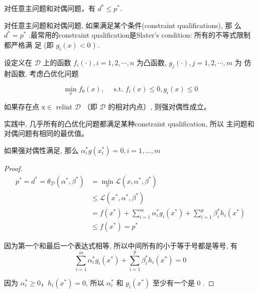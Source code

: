 \begin{theorem}[弱对偶性]
    对任意主问题和对偶问题，有 $ d^{*} \leqslant p^{*} $.
\end{theorem}

\begin{theorem}[强对偶性]
    对任意主问题和对偶问题, 如果满足某个条件(constraint qualifications), 那 么 $ d^{*}=p^{*} $ .最常用的constraint qualification是Slater's condition: 所有的不等式限制都严格满 足 (即 $ g_{i}(x)<0 $ ) .
\end{theorem}

\begin{theorem}[Slater 条件]
    设定义在 $ \mathcal{D} $ 上的函数 $ f_{i}(\cdot), i=1,2, \cdots, n $ 为凸函数, $ g_{j}(\cdot), j=1,2, \cdots, m $ 为 仿射函数, 考虑凸优化问题

    $$
    \min _{{x}} f_{0}({x}), \quad \text { s.t. } f_{i}({x}) \leq 0, g_{i}({x}) \leq 0
    $$

    如果存在点 $ \mathrm{x} \in $ relint $ \mathcal{D} $ （即 $ \mathcal{D} $ 的相对内点）, 则强对偶性成立。
\end{theorem}

实践中, 几乎所有的凸优化问题都满足某种constraint qualification, 所以 主问题和对偶问题有相同的最优值。

\begin{theorem}
    如果强对偶性满足, 那么 $ \alpha_{i}^{*} g\left(x_{i}^{*}\right)=0, i=1, \ldots, m $
    
\end{theorem}

\begin{proof}
    $$
    \begin{aligned}
    p^{*}=d^{*}=\theta_{\mathcal{D}}\left(\alpha^{*}, \beta^{*}\right) &=\min _{x} \mathcal{L}\left(x, \alpha^{*}, \beta^{*}\right) \\
    & \leqslant \mathcal{L}\left(x^{*}, \alpha^{*}, \beta^{*}\right) \\
    &=f\left(x^{*}\right)+\sum_{i=1}^{m} \alpha_{i}^{*} g_{i}\left(x^{*}\right)+\sum_{i=1}^{p} \beta_{i}^{*} h_{i}\left(x^{*}\right) \\
    & \leqslant f\left(x^{*}\right)=p^{*}
    \end{aligned}
    $$

    因为第一个和最后一个表达式相等, 所以中间所有的小于等于号都是等号, 有 $$ \sum_{i=1}^{m} \alpha_{i}^{*} g_{i}\left(x^{*}\right)+\sum_{i=1}^{p} \beta_{i}^{*} h_{i}\left(x^{*}\right)=0 $$

    因为 $ \alpha_{i}^{*} \geqslant 0 ， h_{i}\left(x^{*}\right)=0 $, 所以 $ \alpha_{i}^{*} $ 和 $ g_{i}\left(x^{*}\right) $ 至少有一个是 0 .
\end{proof}

